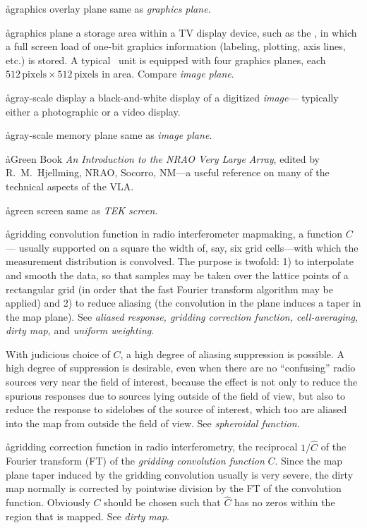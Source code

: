 \aa{graphics overlay plane} same as {\it graphics plane.}

\aa{graphics plane}
a storage area within a TV display device, such as the \iis,
in which a full screen load of one-bit graphics information (labeling,
plotting, axis lines, etc.) is stored.
A typical \iis\ unit is equipped with four graphics planes,
each $512\,\text{pixels}\times512\,\text{pixels}$ in area.
Compare {\it image plane}.

\aa{gray-scale display}
a black-and-white display of a digitized {\it image}---%
typically either a photographic or a video display.

\aa{gray-scale memory plane} same as {\it image plane.}

\aa{Green Book}
{\it An Introduction to the NRAO Very Large Array},
edited by R.~M.~Hjellming, NRAO, Socorro, NM---a useful
reference on many of the technical aspects of the VLA.

\aa{green screen} same as {\it TEK screen}.

\aa{gridding convolution function}
in radio interferometer mapmaking, a function $C$---%
usually supported on a square the width of, say,
six \uv grid cells---with which the \uv measurement distribution
is convolved.
The purpose is twofold: 1) to interpolate and smooth the data, so that
samples may be taken over the lattice points of a rectangular grid
(in order that the fast Fourier transform algorithm may be applied)
and 2) to reduce aliasing (the convolution in the \uv
plane induces a taper in the map plane).
See {\it aliased response, gridding correction function, cell-averaging,
dirty map,} and {\it uniform weighting}.
\par
With judicious choice of $C$, a high degree of aliasing
suppression is possible.
A high degree of suppression is desirable, even when there
are no ``confusing'' radio sources very near the field of interest,
because the effect is not only to reduce the spurious responses due to
sources lying outside of the field of view, but also to
reduce the response to sidelobes of the source of
interest, which too are aliased into the map from outside the
field of view.
See {\it spheroidal function.}

\aa{gridding correction function}
in radio interferometry,
the reciprocal $1/\hat C$ of the Fourier transform (FT)
of the {\it gridding convolution function} $C$.
Since the map plane taper induced by the gridding convolution
usually is very severe, the dirty map normally is corrected
by pointwise division by the FT of the convolution function.
Obviously $C$ should be chosen such that $\hat C$ has no zeros
within the region that is mapped.
See {\it dirty map}.


